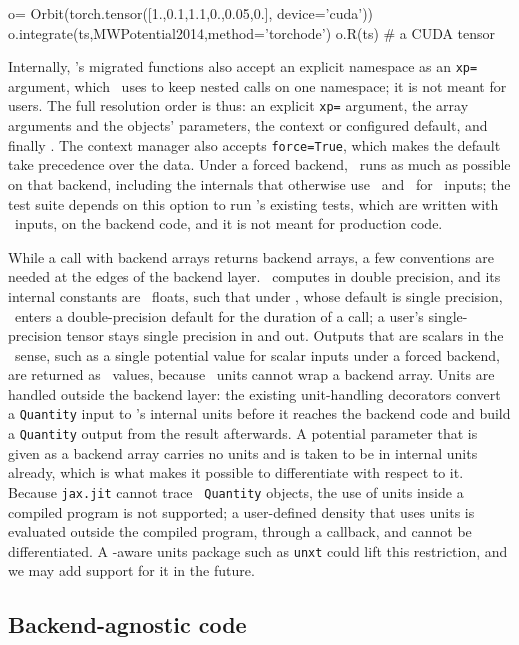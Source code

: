 \begin{code}
o= Orbit(torch.tensor([1.,0.1,1.1,0.,0.05,0.],
                      device='cuda'))
o.integrate(ts,MWPotential2014,method='torchode')
o.R(ts) # a CUDA tensor
\end{code}
Internally, \galpy's migrated functions also accept an explicit
namespace as an \texttt{xp=} argument, which \galpy\ uses to keep
nested calls on one namespace; it is not meant for users. The full
resolution order is thus: an explicit \texttt{xp=} argument, the array
arguments and the objects' parameters, the context or configured
default, and finally \numpy. The context manager also accepts
\texttt{force=True}, which makes the default take precedence over the
data. Under a forced backend,
\galpy\ runs as much as possible on that backend, including the
internals that otherwise use \numpy\ and \scipy\ for \numpy\ inputs;
the test suite depends on this option to run \galpy's existing tests, which
are written with \numpy\ inputs, on the backend code, and it is not
meant for production code.

While a call with backend arrays returns backend arrays, a few
conventions are needed at the edges of the backend layer. \galpy\
computes in double precision, and its internal
constants are \python\ floats, such that under \torch, whose default
is single precision, \galpy\ enters a double-precision default for the
duration of a call; a user's single-precision tensor stays single
precision in and out. Outputs that are scalars in the \numpy\ sense,
such as a single potential value for scalar inputs under a forced
backend, are returned as \numpy\ values, because \astropy\ units cannot
wrap a backend array. Units are handled outside the backend layer: the
existing unit-handling decorators convert a \texttt{Quantity} input to
\galpy's internal units before it reaches the backend code and build a
\texttt{Quantity} output from the result afterwards. A potential
parameter that is given as a backend array carries no units and is
taken to be in internal units already, which is what makes it possible
to differentiate with respect to it. Because \texttt{jax.jit} cannot
trace \astropy\ \texttt{Quantity} objects, the use of units inside a
compiled program is not supported; a user-defined density that uses
units is evaluated outside the compiled program, through a callback,
and cannot be differentiated. A \jax-aware units package such as
\texttt{unxt} \citep{Starkman2025} could lift this restriction, and
we may add support for it in the future.

\subsection{Backend-agnostic code}\label{sec:design-agnostic}

